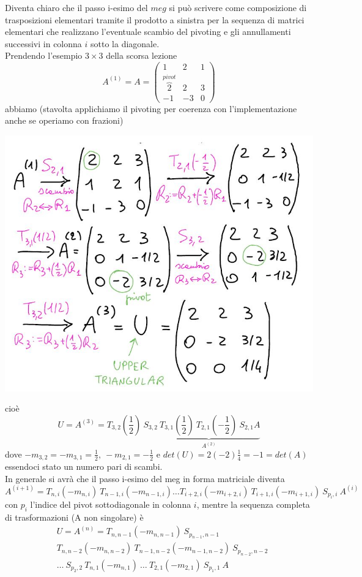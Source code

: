 \documentclass[12pt,a4paper]{article}
\begin{document}
Diventa chiaro che il passo i-esimo del $meg$ si può scrivere come composizione di trasposizioni elementari tramite il prodotto a sinistra per la sequenza di matrici elementari che realizzano l'eventuale scambio del pivoting e gli annullamenti successivi in colonna $i$ sotto la diagonale.\\Prendendo l'esempio $3\times 3$ della scorsa lezione
\begin{equation*}
    A^{(1)}=A=\begin{pmatrix}
        1 & 2 & 1 \\
        \overbrace{2}^{pivot} & 2 & 3 \\
        -1 & -3 & 0
        \end{pmatrix}
\end{equation*}
abbiamo (stavolta applichiamo il pivoting per coerenza con l'implementazione anche se operiamo con frazioni)
\begin{center}
    \includegraphics[scale=0.5]{calcolo1.JPG}    
\end{center}
cioè
\[
U = A^{(3)} = T_{3,2} (\frac{1}{2}) \ S_{3,2} \underbrace{\ T_{3,1} (\frac{1}{2}) \ T_{2,1} (-\frac{1}{2}) \ S_{2,1} A}_{A^{(2)}}
\]
dove $-m_{3,2} = -m_{3,1} = \frac{1}{2}, \ -m_{2,1} = -\frac{1}{2}$ e $det(U) = 2(-2)\frac{1}{4} = -1 = det(A)$ essendoci stato un numero pari di scambi.\\
In generale si avrà che il passo i-esimo del meg in forma matriciale diventa
\[
    A^{(i+1)} = T_{n,i} (-m_{n, i}) \ T_{n-1, i} (-m_{n-1, i}) \dotso T_{i+2, i} (-m_{i+2, i})\ T_{i+1, i} (-m_{i+1, i}) \ S_{p_i, i} \ A^{(i)}
\]
con $p_i$ l'indice del pivot sottodiagonale in colonna $i$, mentre la sequenza completa di trasformazioni (A non singolare) è
\[
\begin{split}
    & U = A^{(n)} = T_{n, n-1} (-m_{n, n-1}) \ S_{p_{n-1}, n-1} \\
    & T_{n, n-2} (-m_{n, n-2}) \ T_{n-1, n-2} (-m_{n-1, n-2}) \ S_{p_{n-2}, n-2} \\
    & \dotso \ S_{p_2, 2} \ T_{n,1} (-m_{n,1}) \ \dotso \ T_{2,1} (-m_{2,1}) \ S_{p_1, 1} \ A
\end{split}
\]
\end{document}
